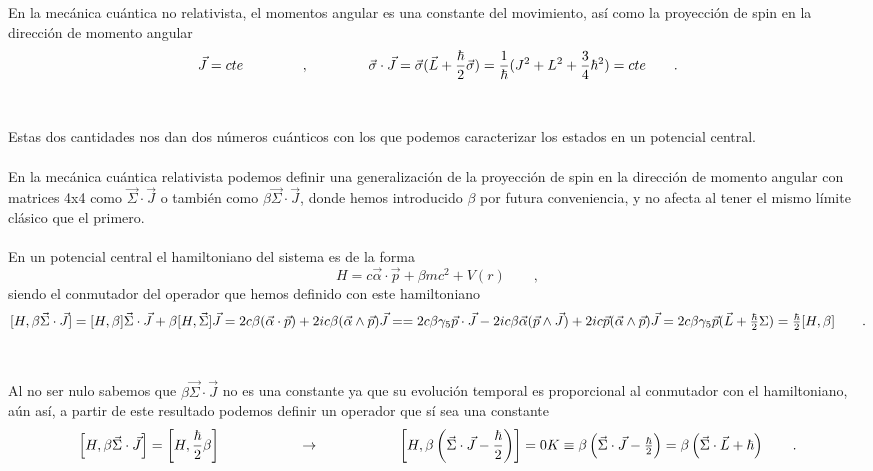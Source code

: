 \documentclass[11pt,letterpaper]{article}     %
\begin{document}
En la mecánica cuántica no relativista, el momentos angular es una constante del movimiento, así como la proyección de spin en la dirección de momento angular
\begin{equation} \label{eq:79}
\vec{J}=cte \hspace{1.5cm}, \hspace{1.5cm} \vec{\sigma}\cdot \vec{J}=\vec{\sigma}(\vec{L}+ \frac{\hbar}{2} \vec{\sigma})=\frac{1}{\hbar}(J^2 + L^2 + \frac{3}{4}\hbar^2)=cte \qquad .
\end{equation} \\ \\
Estas dos cantidades nos dan dos números cuánticos con los que podemos caracterizar los estados en un potencial central. \\ \\
En la mecánica cuántica relativista podemos definir una generalización de la proyección de spin en la dirección de momento angular con matrices 4x4 como $\vec{\Sigma} \cdot \vec{J}$ o también como $\beta \vec{\Sigma} \cdot \vec{J}$, donde hemos introducido $\beta$ por futura conveniencia, y no afecta al tener el mismo límite clásico que el primero. 
\\ \\En un potencial central el hamiltoniano del sistema es de la forma
\begin{equation} \label{eq:80}
H=c \vec{\alpha} \cdot \vec{p} + \beta mc^2 + V(r) \qquad ,
\end{equation}
siendo el conmutador del operador que hemos definido con este hamiltoniano
\begin{equation} \label{eq:81}
[H,\beta \vec{\Sigma}\cdot \vec{J}]=[H,\beta]\vec{\Sigma}\cdot\vec{J}+\beta[H,\vec{\Sigma}]\vec{J}=2c\beta(\vec{\alpha}\cdot\vec{p}) + 2ic\beta(\vec{\alpha}\wedge \vec{p})\vec{J}= $$\\$$= 2c\beta \gamma_5 \vec{p} \cdot \vec{J}-2ic\beta \vec{\alpha}(\vec{p}\wedge \vec{J})+ 2ic\vec{p}(\vec{\alpha} \wedge \vec{p})\vec{J}= 2c\beta \gamma_5 \vec{p}(\vec{L} + \frac{\hbar}{2}\Sigma)=\frac{\hbar}{2}[H, \beta] \qquad .
\end{equation}  \\ \\
Al no ser nulo sabemos que $\beta \vec{\Sigma}\cdot\vec{J}$ no es una constante ya que su evolución temporal es proporcional al conmutador con el hamiltoniano, aún así, a partir de este resultado podemos definir un operador que sí sea una constante
\begin{equation} \label{eq:82}
\left[H, \beta \vec{\Sigma}\cdot \vec{J}\right]=\left[H, \frac{\hbar}{2}\beta\right] \hspace{2cm} \rightarrow \hspace{2cm} \left[H, \beta\left(\vec{\Sigma}\cdot \vec{J}-\frac{\hbar}{2}\right)\right]=0 $$\\$$ K \equiv \beta\left(\vec{\Sigma}\cdot \vec{J}-\frac{\hbar}{2}\right)=\beta\left(\vec{\Sigma}\cdot \vec{L} + \hbar\right) \qquad . 
\end{equation} \\ \\
\end{document}
